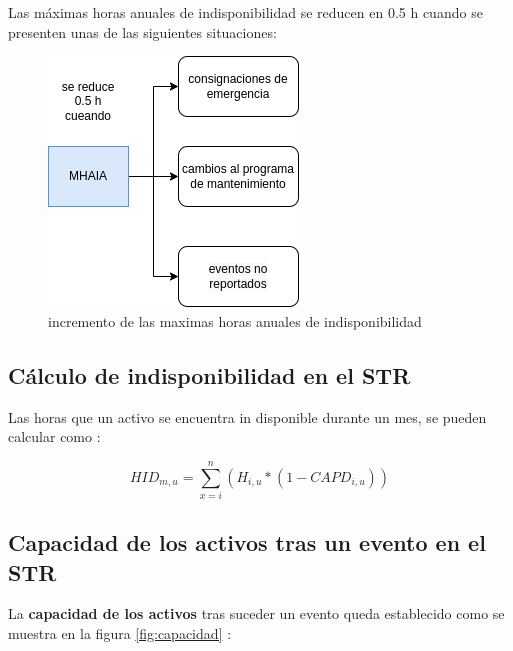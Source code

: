 \documentclass[a5paper]{book}%
\begin{document}
   Las máximas horas anuales de indisponibilidad  se reducen en 0.5 h cuando se presenten unas de las siguientes situaciones:
  
  \begin{figure}[H]
    \centering
    \caption{incremento de las maximas horas anuales de indisponibilidad}
    \label{fig:mhaia}
    \includegraphics[width=0.6\linewidth]{MHAIA}
  \end{figure}

\subsection{Cálculo de indisponibilidad en el STR}
Las horas que un activo  se encuentra  in disponible durante un mes, se pueden calcular como \cite{CREG0152018}:

\[ HID_{m,u} = \sum_{x=i}^{n}(H_{i,u}*(1-CAPD_{i,u}))  \]

\subsection{Capacidad de los activos tras un evento en el STR}

    La \textbf{capacidad de los activos} tras suceder un evento queda establecido  como se muestra en la figura \ref{fig:capacidad} \cite{CREG0152018}:
\end{document}
